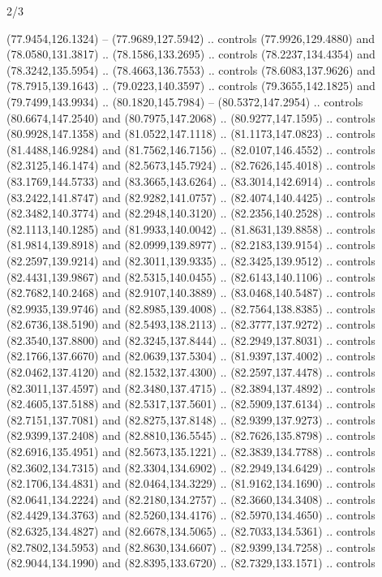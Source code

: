 \begin{flagdescription}{2/3}
\begin{scope}[shift={(0.5\flaglength,0.5)},scale=\flagwidth/320]
\begin{scope}[y=0.8pt, x=0.8pt, yscale=-1,shift={(-118.3,-146)}]
  (77.9454,126.1324) -- (77.9689,127.5942) .. controls (77.9926,129.4880) and
  (78.0580,131.3817) .. (78.1586,133.2695) .. controls (78.2237,134.4354) and
  (78.3242,135.5954) .. (78.4663,136.7553) .. controls (78.6083,137.9626) and
  (78.7915,139.1643) .. (79.0223,140.3597) .. controls (79.3655,142.1825) and
  (79.7499,143.9934) .. (80.1820,145.7984) -- (80.5372,147.2954) .. controls
  (80.6674,147.2540) and (80.7975,147.2068) .. (80.9277,147.1595) .. controls
  (80.9928,147.1358) and (81.0522,147.1118) .. (81.1173,147.0823) .. controls
  (81.4488,146.9284) and (81.7562,146.7156) .. (82.0107,146.4552) .. controls
  (82.3125,146.1474) and (82.5673,145.7924) .. (82.7626,145.4018) .. controls
  (83.1769,144.5733) and (83.3665,143.6264) .. (83.3014,142.6914) .. controls
  (83.2422,141.8747) and (82.9282,141.0757) .. (82.4074,140.4425) .. controls
  (82.3482,140.3774) and (82.2948,140.3120) .. (82.2356,140.2528) .. controls
  (82.1113,140.1285) and (81.9933,140.0042) .. (81.8631,139.8858) .. controls
  (81.9814,139.8918) and (82.0999,139.8977) .. (82.2183,139.9154) .. controls
  (82.2597,139.9214) and (82.3011,139.9335) .. (82.3425,139.9512) .. controls
  (82.4431,139.9867) and (82.5315,140.0455) .. (82.6143,140.1106) .. controls
  (82.7682,140.2468) and (82.9107,140.3889) .. (83.0468,140.5487) .. controls
  (82.9935,139.9746) and (82.8985,139.4008) .. (82.7564,138.8385) .. controls
  (82.6736,138.5190) and (82.5493,138.2113) .. (82.3777,137.9272) .. controls
  (82.3540,137.8800) and (82.3245,137.8444) .. (82.2949,137.8031) .. controls
  (82.1766,137.6670) and (82.0639,137.5304) .. (81.9397,137.4002) .. controls
  (82.0462,137.4120) and (82.1532,137.4300) .. (82.2597,137.4478) .. controls
  (82.3011,137.4597) and (82.3480,137.4715) .. (82.3894,137.4892) .. controls
  (82.4605,137.5188) and (82.5317,137.5601) .. (82.5909,137.6134) .. controls
  (82.7151,137.7081) and (82.8275,137.8148) .. (82.9399,137.9273) .. controls
  (82.9399,137.2408) and (82.8810,136.5545) .. (82.7626,135.8798) .. controls
  (82.6916,135.4951) and (82.5673,135.1221) .. (82.3839,134.7788) .. controls
  (82.3602,134.7315) and (82.3304,134.6902) .. (82.2949,134.6429) .. controls
  (82.1706,134.4831) and (82.0464,134.3229) .. (81.9162,134.1690) .. controls
  (82.0641,134.2224) and (82.2180,134.2757) .. (82.3660,134.3408) .. controls
  (82.4429,134.3763) and (82.5260,134.4176) .. (82.5970,134.4650) .. controls
  (82.6325,134.4827) and (82.6678,134.5065) .. (82.7033,134.5361) .. controls
  (82.7802,134.5953) and (82.8630,134.6607) .. (82.9399,134.7258) .. controls
  (82.9044,134.1990) and (82.8395,133.6720) .. (82.7329,133.1571) .. controls

\end{scope}
\end{scope}
\end{flagdescription}
